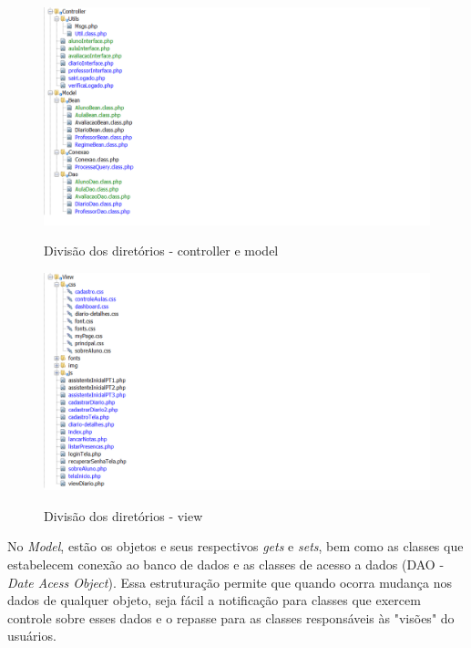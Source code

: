 \begin{figure}[!htb]
	\centering
	
	\includegraphics[scale=1.0]{controller-model}\\  %
	\caption{Divisão dos diretórios - controller e model} %
	{\small } %
	\label{fig:controller-model} %
\end{figure}

\begin{figure}[!htb]
	\centering	
	\includegraphics[scale=0.9]{view}\\  %
	\caption{Divisão dos diretórios - view} %
	{\small } %
	\label{fig:view} %
\end{figure}

No \textit{Model}, estão os objetos e seus respectivos \textit{gets} e \textit{sets}, bem como as classes que estabelecem conexão ao banco de dados e as classes de acesso a dados (DAO - \textit{Date Acess Object}). Essa estruturação permite que quando ocorra mudança nos dados de qualquer objeto, seja fácil a notificação para classes que exercem controle sobre esses dados e o repasse para as classes responsáveis às "visões" do usuários.

